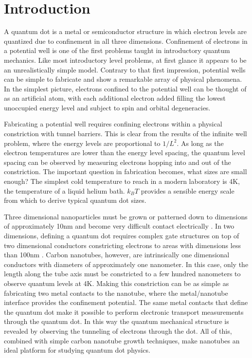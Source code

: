 \chapter{Introduction}
\label{sec:intro}

A quantum dot is a metal or semiconductor structure in which electron levels are quantized due to confinement in all three dimensions. Confinement of electrons in a potential well is one of the first problems taught in introductory quantum mechanics. Like most introductory level problems, at first glance it appears to be an unrealistically simple model. Contrary to that first impression, potential wells can be simple to fabricate and show a remarkable array of physical phenomena. In the simplest picture, electrons confined to the potential well can be thought of as an artificial atom, with each additional electron added filling the lowest unoccupied energy level and subject to spin and orbital degeneracies. 

Fabricating a potential well requires confining electrons within a physical constriction  with tunnel barriers. This is clear from the results of the infinite well problem, where the energy levels are proportional to $1/L^2$. As long as the electron temperatures are lower than the energy level spacing, the quantum level spacing can be observed by measuring electrons hopping into and out of the constriction. The important question in fabrication becomes, what sizes are small enough? The simplest cold temperature to reach in a modern laboratory is 4K, the temperature of a liquid helium bath. $k_B T$ provides a sensible energy scale from which to derive typical quantum dot sizes. 

Three dimensional nanoparticles must be grown or patterned down to dimensions of approximately 10nm and become very difficult contact electrically \cite{Ralph1997, Davidovic1998}. In two dimensions, defining a quantum dot requires complex gate structures on top of two dimensional conductors constricting electrons to areas with dimensions less than 100nm \cite{McEuen1992, Klein1995}. Carbon nanotubes, however, are intrinsically one dimensional conductors with diameters of approximately one nanometer. In this case, only the length along the tube axis must be constricted to a few hundred nanometers to observe quantum levels at 4K. Making this constriction can be as simple as fabricating two metal contacts to the nanotube, where the metal/nanotube interface provides the confinement potential. The same metal contacts that define the quantum dot make it possible to perform electronic transport measurements through the quantum dot. In this way the quantum mechanical structure is revealed by observing the tunneling of electrons through the dot. All of this, combined with simple carbon nanotube growth techniques, make nanotubes an ideal platform for studying quantum dot physics.

